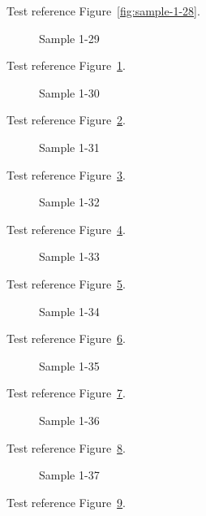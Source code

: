 Test reference Figure~\ref{fig:sample-1-28}.

\begin{figure}[tbhp]
\caption{Sample 1-29}
\label{fig:sample-1-29}
\end{figure}

Test reference Figure~\ref{fig:sample-1-29}.

\begin{figure}[tbhp]
\caption{Sample 1-30}
\label{fig:sample-1-30}
\end{figure}

Test reference Figure~\ref{fig:sample-1-30}.

\begin{figure}[tbhp]
\caption{Sample 1-31}
\label{fig:sample-1-31}
\end{figure}

Test reference Figure~\ref{fig:sample-1-31}.

\begin{figure}[tbhp]
\caption{Sample 1-32}
\label{fig:sample-1-32}
\end{figure}

Test reference Figure~\ref{fig:sample-1-32}.

\begin{figure}[tbhp]
\caption{Sample 1-33}
\label{fig:sample-1-33}
\end{figure}

Test reference Figure~\ref{fig:sample-1-33}.

\begin{figure}[tbhp]
\caption{Sample 1-34}
\label{fig:sample-1-34}
\end{figure}

Test reference Figure~\ref{fig:sample-1-34}.

\begin{figure}[tbhp]
\caption{Sample 1-35}
\label{fig:sample-1-35}
\end{figure}

Test reference Figure~\ref{fig:sample-1-35}.

\begin{figure}[tbhp]
\caption{Sample 1-36}
\label{fig:sample-1-36}
\end{figure}

Test reference Figure~\ref{fig:sample-1-36}.

\begin{figure}[tbhp]
\caption{Sample 1-37}
\label{fig:sample-1-37}
\end{figure}

Test reference Figure~\ref{fig:sample-1-37}.

